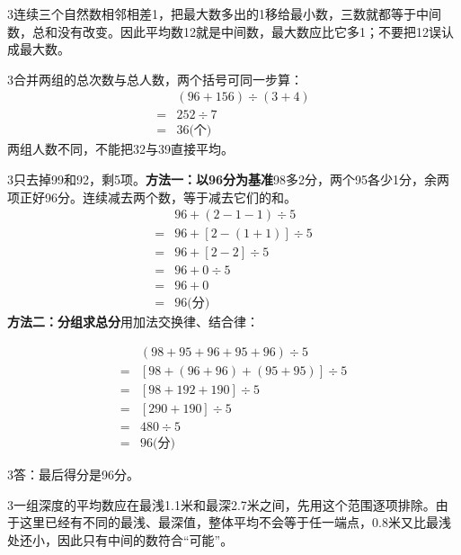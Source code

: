 \documentclass[multi=snippet,border={5bp 20bp 5bp 5bp}]{standalone}
\newenvironment{snippet}[3]{\begin{minipage}{#1bp}\color{answerred}\fontsize{#2}{#3}\selectfont\raggedright}{\end{minipage}}
\begin{document}
\begin{snippet}{505}{11.5}{14}\begin{multicols}{3}\raggedcolumns 连续三个自然数相邻相差1，把最大数多出的1移给最小数，三数就都等于中间数，总和没有改变。因此平均数12就是中间数，最大数应比它多1；不要把12误认成最大数。\end{multicols}\end{snippet}
\begin{snippet}{505}{11.5}{14}\begin{multicols}{3}\raggedcolumns 合并两组的总次数与总人数，两个括号可同一步算：\[\begin{aligned}&(96+156)\div(3+4)\\={}&252\div7\\={}&36\text{(个)}\end{aligned}\]两组人数不同，不能把32与39直接平均。\end{multicols}\end{snippet}
\begin{snippet}{505}{11.5}{14}\begin{multicols}{3}\raggedcolumns 只去掉99和92，剩5项。\textbf{方法一：以96分为基准}98多2分，两个95各少1分，余两项正好96分。连续减去两个数，等于减去它们的和。\[\begin{aligned}&96+(2-1-1)\div5\\={}&96+[2-(1+1)]\div5\\={}&96+[2-2]\div5\\={}&96+0\div5\\={}&96+0\\={}&96\text{(分)}\end{aligned}\]\textbf{方法二：分组求总分}用加法交换律、结合律：\end{multicols}\[\begin{aligned}&(98+95+96+95+96)\div5\\={}&[98+(96+96)+(95+95)]\div5\\={}&[98+192+190]\div5\\={}&[290+190]\div5\\={}&480\div5\\={}&96\text{(分)}\end{aligned}\]\begin{multicols}{3}\raggedcolumns 答：最后得分是96分。\end{multicols}\end{snippet}
\begin{snippet}{505}{11.5}{14}\begin{multicols}{3}\raggedcolumns 一组深度的平均数应在最浅1.1米和最深2.7米之间，先用这个范围逐项排除。由于这里已经有不同的最浅、最深值，整体平均不会等于任一端点，0.8米又比最浅处还小，因此只有中间的数符合“可能”。\end{multicols}\end{snippet}
\end{document}
